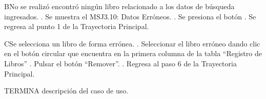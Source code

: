 		\begin{UCtrayectoriaA}{B}{No se realizó encontró ningún libro relacionado a los datos de búsqueda ingresados.}
			.	Se muestra el MSJ3.10: Datos Erróneos. 
			. Se presiona el botón 			
			.	Se regresa al punto 1 de la Trayectoria Principal.
		\end{UCtrayectoriaA}
		\begin{UCtrayectoriaA}{C}{Se selecciona un libro de forma errónea.}
			. Seleccionar el libro erróneo dando clic en el botón circular que encuentra en la primera columna de la tabla “Registro de Libros”
			. Pulsar el botón “Remover”.			
			.	Regresa al paso 6 de la Trayectoria Principal.
		\end{UCtrayectoriaA}
TERMINA descripción del caso de uso.